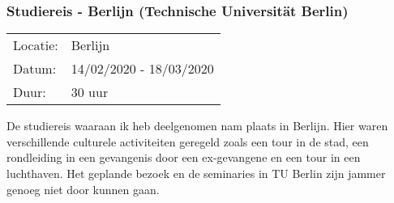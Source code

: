 \subsubsection{Studiereis - Berlijn (Technische Universität Berlin)}

\begin{tabular}{l l}
  Locatie: & Berlijn\\
  Datum: & 14/02/2020 - 18/03/2020\\
  Duur: & 30 uur
\end{tabular}

De studiereis waaraan ik heb deelgenomen nam plaats in Berlijn. Hier waren verschillende culturele activiteiten geregeld zoals een tour in de stad, een rondleiding in een gevangenis door een ex\hyp{}gevangene en een tour in een luchthaven. Het geplande bezoek en de seminaries in TU Berlin zijn jammer genoeg niet door kunnen gaan.